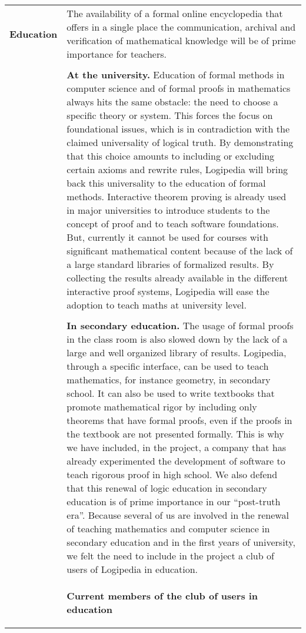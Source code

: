 \begin{longtable}{|p{}|p{}|}
\hline
{\bf Education}
&
The availability of a formal online encyclopedia that offers in a
single place the communication, archival and verification of
mathematical knowledge will be of prime importance for teachers.\\
&\\
&
{\bf At the university.}
Education of formal methods in computer science and of formal proofs
in mathematics always hits the same obstacle: the need to choose a
specific theory or system. This forces the focus on foundational issues, which is in
contradiction with the claimed universality of logical truth.
By demonstrating that this choice amounts to including or excluding
certain axioms and rewrite rules, Logipedia will bring back this
universality to the education of formal methods.  Interactive
theorem proving is already used in major universities to introduce
students to the concept of proof and to teach software foundations.
But, currently it cannot be used for courses with significant
mathematical content because of the lack of a large standard libraries
of formalized results.  By collecting the results already available in
the different interactive proof systems, Logipedia will ease the
adoption to teach maths at university level.\\
&\\
&
{\bf In secondary education.}
The usage of formal proofs in the class room is also slowed down by the
lack of a large and well organized library of results.  Logipedia,
through a specific interface, can be used to teach mathematics, for
instance geometry, in secondary school.  It can also be used to write
textbooks that promote mathematical rigor by including only
theorems that have formal proofs, even if the proofs in the textbook
are not presented formally.
This is why we have included, in the project, a company that has
already experimented the development of software to teach rigorous proof
in high school.
We also defend that this renewal of logic education in secondary education
is of prime importance in our ``post-truth era''.
Because several of us are involved in the renewal of teaching
mathematics and computer science in secondary education and in the
first years of university, we felt the need to include in the project
a club of users of Logipedia in education.\\
&
\begin{framed}
\begin{center}
{\bf \Large Current members of the club of users in education}
\end{center}


\end{framed}
\end{longtable}
